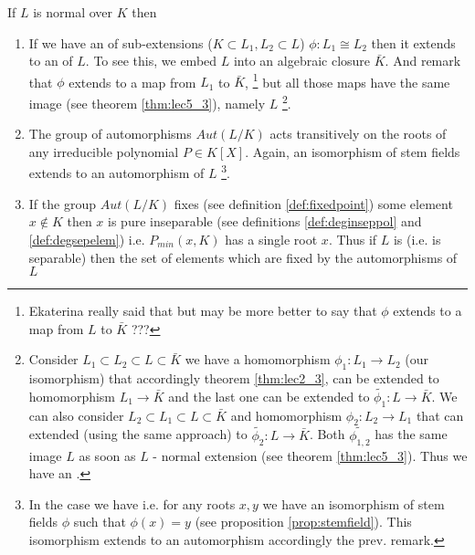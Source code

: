 \begin{remark}
  \label{rem:lec5_onnormalext}
  If $L$ is normal over $K$ then
  \begin{enumerate}
  \item If we have an  of sub-extensions
    ($K \subset L_1, L_2 \subset L$)
    $\phi: L_1 \cong L_2$ then it extends to an
     of $L$.  To see this, we embed $L$ into
    an algebraic closure $\bar{K}$. And remark that $\phi$ extends to a
    map from $L_1$ to $\bar{K}$,
    \footnote{
      Ekaterina really said that but may be more better to say that
      $\phi$ extends to a map from $L$ to $\bar{K}$ ???
    }
    but all those maps have the same
    image (see theorem \ref{thm:lec5_3}), namely $L$
    \footnote{
      Consider $L_1 \subset L_2 \subset L \subset \bar{K}$ we have a
      homomorphism $\phi_1: L_1 \to L_2$ (our isomorphism) that
      accordingly theorem \ref{thm:lec2_3}, can be extended to
      homomorphism $L_1 \to \bar{K}$ and the last one can be extended
      to $\tilde{\phi_1}: L \to \bar{K}$. We can also consider
      $L_2 \subset L_1 \subset L \subset \bar{K}$ and homomorphism
      $\phi_2: L_2 \to L_1$ that can extended (using the same
      approach) to  $\tilde{\phi_2}: L \to \bar{K}$. Both
      $\tilde{\phi_{1,2}}$ has the same image $L$ as soon as $L$ -
      normal extension (see theorem \ref{thm:lec5_3}). Thus we have an
      . 
    }.  
  \item \label{rem:item:lec5_onnormalext_2} The group of automorphisms $Aut\left(L/K\right)$ acts
    transitively on the roots of any irreducible polynomial $P \in
    K\left[X\right]$. Again, an isomorphism of stem fields extends to
    an automorphism of $L$
    \footnote{
      In the case we have  i.e. for any roots
      $x,y$ we have an isomorphism of stem fields $\phi$ such that
      $\phi(x) = y$ (see proposition \ref{prop:stemfield}). This
      isomorphism extends to an automorphism accordingly the
      prev. remark.  
    }.
  \item If the group $Aut\left(L/K\right)$ fixes (see definition
    \label{rem:item:lec5_onnormalext_3}
    \ref{def:fixedpoint}) some element $x \notin K$ then $x$ is pure
    inseparable (see definitions 
    \ref {def:deginseppol} and \ref{def:degsepelem}) i.e.
    $P_{min}\left(x, K\right)$ has a 
    single root $x$. Thus if $L$ is
     (i.e. is separable) then
    the set of elements which are fixed  by the automorphisms  of $L$

\end{enumerate}
\end{remark}
